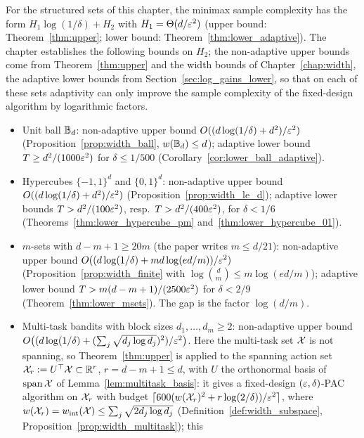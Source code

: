 \begin{remark}\label{rem:table}
For the structured sets of this chapter, the minimax sample complexity has the form
$H_1\log(1/\delta) + H_2$ with $H_1 = \Theta(d/\varepsilon^2)$ (upper bound: Theorem~\ref{thm:upper};
lower bound: Theorem~\ref{thm:lower_adaptive}). The chapter establishes the following
bounds on $H_2$; the non-adaptive upper bounds come from Theorem~\ref{thm:upper} and the
width bounds of Chapter~\ref{chap:width}, the adaptive lower bounds from
Section~\ref{sec:log_gains_lower}, so that on each of these sets adaptivity can only improve
the sample complexity of the fixed-design algorithm by logarithmic factors.
\begin{itemize}
  \item Unit ball $\mathbb{B}_d$: non-adaptive upper bound $O((d\log(1/\delta) + d^2)/\varepsilon^2)$
        (Proposition~\ref{prop:width_ball}, $w(\mathbb{B}_d) \le d$); adaptive lower bound
        $T \ge d^2/(1000\varepsilon^2)$ for $\delta \le 1/500$ (Corollary~\ref{cor:lower_ball_adaptive}).
  \item Hypercubes $\{-1,1\}^d$ and $\{0,1\}^d$: non-adaptive upper bound
        $O((d\log(1/\delta) + d^2)/\varepsilon^2)$ (Proposition~\ref{prop:width_le_d}); adaptive lower
        bounds $T > d^2/(100\varepsilon^2)$, resp.\ $T > d^2/(400\varepsilon^2)$, for $\delta < 1/6$
        (Theorems~\ref{thm:lower_hypercube_pm} and~\ref{thm:lower_hypercube_01}).
  \item $m$-sets with $d - m + 1 \ge 20m$ (the paper writes $m \le d/21$): non-adaptive
        upper bound $O((d\log(1/\delta) + md\log(ed/m))/\varepsilon^2)$
        (Proposition~\ref{prop:width_finite} with $\log\binom dm \le m\log(ed/m)$); adaptive
        lower bound $T > m(d-m+1)/(2500\varepsilon^2)$ for $\delta < 2/9$ (Theorem~\ref{thm:lower_msets}).
        The gap is the factor $\log(d/m)$.
  \item Multi-task bandits with block sizes $d_1,\dots,d_m \ge 2$: non-adaptive upper bound
        $O\big((d\log(1/\delta) + (\sum_j\sqrt{d_j\log d_j})^2)/\varepsilon^2\big)$. Here the
        multi-task set $\mathcal{X}$ is not spanning, so Theorem~\ref{thm:upper} is applied to the
        spanning action set $\mathcal{X}_r := U^\top\mathcal{X} \subset \mathbb{R}^{r}$, $r = d - m + 1 \le d$, with
        $U$ the orthonormal basis of $\operatorname{span}\mathcal{X}$ of Lemma~\ref{lem:multitask_basis}: it gives
        a fixed-design $(\varepsilon,\delta)$-PAC algorithm on $\mathcal{X}_r$ with budget
        $\lceil 600(w(\mathcal{X}_r)^2 + r\log(2/\delta))/\varepsilon^2\rceil$, where
        $w(\mathcal{X}_r) = w_{\mathrm{int}}(\mathcal{X}) \le \sum_j\sqrt{2d_j\log d_j}$
        (Definition~\ref{def:width_subspace}, Proposition~\ref{prop:width_multitask}); this

\end{itemize}
\end{remark}
